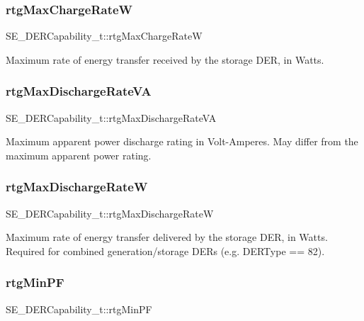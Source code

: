 \subsubsection{\texorpdfstring{rtg\+Max\+Charge\+RateW}{rtgMaxChargeRateW}}
{\footnotesize\ttfamily S\+E\+\_\+\+D\+E\+R\+Capability\+\_\+t\+::rtg\+Max\+Charge\+RateW}

Maximum rate of energy transfer received by the storage D\+ER, in Watts. \mbox{\label{group__DERCapability_ga68954554c11aab995b225b64dcae7501}} 
\subsubsection{\texorpdfstring{rtg\+Max\+Discharge\+Rate\+VA}{rtgMaxDischargeRateVA}}
{\footnotesize\ttfamily S\+E\+\_\+\+D\+E\+R\+Capability\+\_\+t\+::rtg\+Max\+Discharge\+Rate\+VA}

Maximum apparent power discharge rating in Volt-\/\+Amperes. May differ from the maximum apparent power rating. \mbox{\label{group__DERCapability_gaf6967bed463f21a9877a155c994753d2}} 
\subsubsection{\texorpdfstring{rtg\+Max\+Discharge\+RateW}{rtgMaxDischargeRateW}}
{\footnotesize\ttfamily S\+E\+\_\+\+D\+E\+R\+Capability\+\_\+t\+::rtg\+Max\+Discharge\+RateW}

Maximum rate of energy transfer delivered by the storage D\+ER, in Watts. Required for combined generation/storage D\+E\+Rs (e.\+g. D\+E\+R\+Type == 82). \mbox{\label{group__DERCapability_ga72727afdb49427d03d3d113d0d2d6bf5}} 
\subsubsection{\texorpdfstring{rtg\+Min\+PF}{rtgMinPF}}
{\footnotesize\ttfamily S\+E\+\_\+\+D\+E\+R\+Capability\+\_\+t\+::rtg\+Min\+PF}

